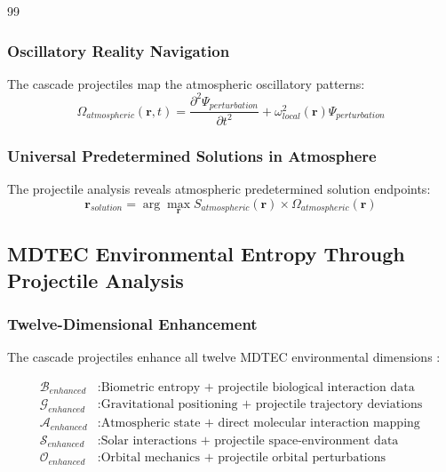\documentclass[12pt,a4paper]{article}
\begin{document}
\begin{thebibliography}{99}
\subsubsection{Oscillatory Reality Navigation}

The cascade projectiles map the atmospheric oscillatory patterns:
\begin{equation}
\Omega_{atmospheric}(\mathbf{r},t) = \frac{\partial^2 \Psi_{perturbation}}{\partial t^2} + \omega_{local}^2(\mathbf{r}) \Psi_{perturbation}
\end{equation}

\subsubsection{Universal Predetermined Solutions in Atmosphere}

The projectile analysis reveals atmospheric predetermined solution endpoints:
\begin{equation}
\mathbf{r}_{solution} = \arg\max_{\mathbf{r}} S_{atmospheric}(\mathbf{r}) \times \Omega_{atmospheric}(\mathbf{r})
\end{equation}

\subsection{MDTEC Environmental Entropy Through Projectile Analysis}

\subsubsection{Twelve-Dimensional Enhancement}

The cascade projectiles enhance all twelve MDTEC environmental dimensions \cite{mdtec_framework}:

\begin{align}
\mathcal{B}_{enhanced} &: \text{Biometric entropy + projectile biological interaction data} \\
\mathcal{G}_{enhanced} &: \text{Gravitational positioning + projectile trajectory deviations} \\
\mathcal{A}_{enhanced} &: \text{Atmospheric state + direct molecular interaction mapping} \\
\mathcal{S}_{enhanced} &: \text{Solar interactions + projectile space-environment data} \\
\mathcal{O}_{enhanced} &: \text{Orbital mechanics + projectile orbital perturbations}
\end{align}


\end{thebibliography}
\end{document}
